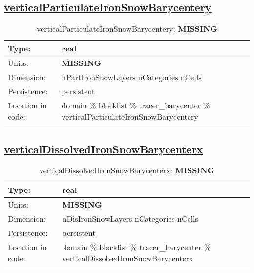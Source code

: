 \subsection[verticalParticulateIronSnowBarycentery]{\hyperref[sec:var_tab_tracer_barycenter]{verticalParticulateIronSnowBarycentery}}
\label{subsec:var_sec_tracer_barycenter_verticalParticulateIronSnowBarycentery}
\begin{center}
\begin{longtable}{| p{2.0in} | p{4.0in} |}
        \hline 
        Type: & real \\
        \hline 
        Units: & {\bf \color{red} MISSING} \\
        \hline 
        Dimension: & nPartIronSnowLayers nCategories nCells \\
        \hline 
        Persistence: & persistent \\
        \hline 
         Location in code: & domain \% blocklist \% tracer\_barycenter \% verticalParticulateIronSnowBarycentery \\
         \hline 
    \caption{verticalParticulateIronSnowBarycentery: {\bf \color{red} MISSING}}
\end{longtable}
\end{center}
\subsection[verticalDissolvedIronSnowBarycenterx]{\hyperref[sec:var_tab_tracer_barycenter]{verticalDissolvedIronSnowBarycenterx}}
\label{subsec:var_sec_tracer_barycenter_verticalDissolvedIronSnowBarycenterx}
\begin{center}
\begin{longtable}{| p{2.0in} | p{4.0in} |}
        \hline 
        Type: & real \\
        \hline 
        Units: & {\bf \color{red} MISSING} \\
        \hline 
        Dimension: & nDisIronSnowLayers nCategories nCells \\
        \hline 
        Persistence: & persistent \\
        \hline 
         Location in code: & domain \% blocklist \% tracer\_barycenter \% verticalDissolvedIronSnowBarycenterx \\
         \hline 
    \caption{verticalDissolvedIronSnowBarycenterx: {\bf \color{red} MISSING}}
\end{longtable}
\end{center}
